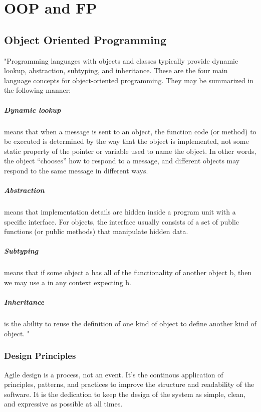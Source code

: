 \chapter{OOP and FP}
\section{Object Oriented Programming}
"Programming languages with objects and classes typically provide dynamic lookup, abstraction, subtyping, and inheritance. These are the four main language concepts for object-oriented programming. They may be summarized in the following manner:
\paragraph{Dynamic lookup} means that when a message is sent to an object, the function code (or method) to be executed is determined by the way that the object is implemented, not some static property of the pointer or variable used to name the object. In other words, the object “chooses” how to respond to a message, and different objects may respond to the same message in different ways.
\paragraph{Abstraction} means that implementation details are hidden inside a program unit with a specific interface. For objects, the interface usually consists of a set of public functions (or public methods) that manipulate hidden data.
\paragraph{Subtyping} means that if some object a has all of the functionality of another object b, then we may use a in any context expecting b.
\paragraph{Inheritance} is the ability to reuse the definition of one kind of object to define another kind of object.
"\cite{concepts}

\subsection{Design Principles}

Agile design is a process, not an event.
It's the continous application of principles, patterns, and practices to improve the structure and readability of the software. 
It is the dedication to keep the design of the system as simple, clean, and expressive as possible at all times.\cite{MartinASD}

